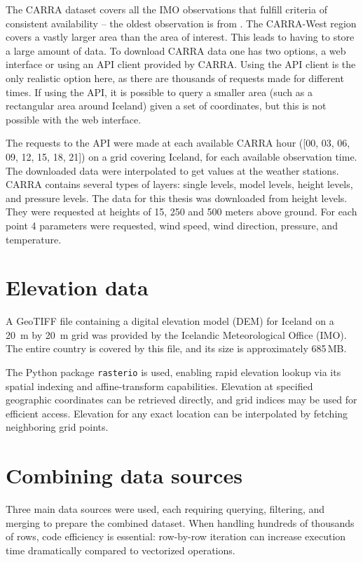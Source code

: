 The CARRA dataset covers all the IMO observations that fulfill criteria of consistent availability – the oldest observation is from \startDateVedur. The CARRA-West region covers a vastly larger area than the area of interest. This leads to having to store a large amount of data. To download CARRA data one has two options, a web interface or using an API client provided by CARRA. Using the API client is the only realistic option here, as there are thousands of requests made for different times. If using the API, it is possible to query a smaller area (such as a rectangular area around Iceland) given a set of coordinates, but this is not possible with the web interface.

The requests to the API were made at each available CARRA hour ([00, 03, 06, 09, 12, 15, 18, 21]) on a grid covering Iceland, for each available observation time. The downloaded data were interpolated to get values at the weather stations. CARRA contains several types of layers: single levels, model levels, height levels, and pressure levels. The data for this thesis was downloaded from height levels. They were requested at heights of 15, 250 and 500 meters above ground. For each point 4 parameters were requested, wind speed, wind direction, pressure, and temperature.

\section{Elevation data}
A GeoTIFF file containing a digital elevation model (DEM) for Iceland on a 20~m by 20~m grid was provided by the Icelandic Meteorological Office (IMO). The entire country is covered by this file, and its size is approximately 685\,MB.

The Python package \texttt{rasterio} is used, enabling rapid elevation lookup via its spatial indexing and affine‐transform capabilities. Elevation at specified geographic coordinates can be retrieved directly, and grid indices may be used for efficient access. Elevation for any exact location can be interpolated by fetching neighboring grid points.

\section{Combining data sources}

Three main data sources were used, each requiring querying, filtering, and merging to prepare the combined dataset. When handling hundreds of thousands of rows, code efficiency is essential: row-by-row iteration can increase execution time dramatically compared to vectorized operations.

